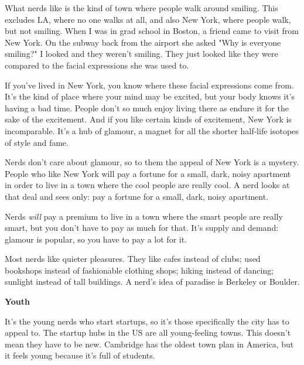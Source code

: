 What nerds like is the kind of town where people
                  walk around smiling. This excludes LA, where no one walks at
                  all, and also New York, where people walk, but not smiling.
                  When I was in grad school in Boston, a friend came to visit
                  from New York. On the subway back from the airport she asked
                  "Why is everyone smiling?" I looked and they weren't smiling.
                  They just looked like they were compared to the facial
                  expressions she was used to.

If you've lived in New
                  York, you know where these facial expressions come from. It's
                  the kind of place where your mind may be excited, but your
                  body knows it's having a bad time. People don't so much enjoy
                  living there as endure it for the sake of the excitement. And
                  if you like certain kinds of excitement, New York is
                  incomparable. It's a hub of glamour, a magnet for all the
                  shorter half-life isotopes of style and fame.

Nerds
                  don't care about glamour, so to them the appeal of New York is
                  a mystery. People who like New York will pay a fortune for a
                  small, dark, noisy apartment in order to live in a town where
                  the cool people are really cool. A nerd looks at that deal and
                  sees only: pay a fortune for a small, dark, noisy
                  apartment.

Nerds \emph{will} pay a premium to live
                  in a town where the smart people are really smart, but you
                  don't have to pay as much for that. It's supply and demand:
                  glamour is popular, so you have to pay a lot for it.

Most
                  nerds like quieter pleasures. They like cafes instead of
                  clubs; used bookshops instead of fashionable clothing shops;
                  hiking instead of dancing; sunlight instead of tall buildings.
                  A nerd's idea of paradise is Berkeley or Boulder.

\textbf{Youth}

It's the young nerds who start startups, so it's
                  those specifically the city has to appeal to. The startup hubs
                  in the US are all young-feeling towns. This doesn't mean they
                  have to be new. Cambridge has the oldest town plan in America,
                  but it feels young because it's full of students.

